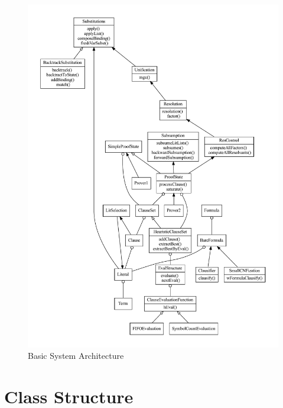 \documentclass{llncs}
\begin{document}
\begin{figure}
  \centering
  \includegraphics[width=6in]{architecture.pdf}
  \caption{Basic System Architecture}
  \label{fig:SysArch}
\end{figure}

\section{Class Structure}
\end{document}
